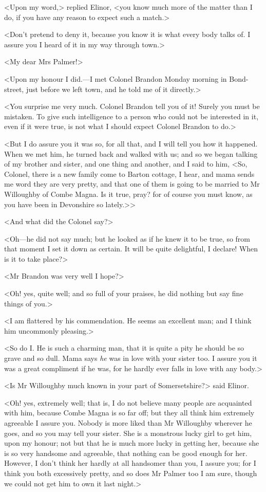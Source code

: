 <Upon my word,> replied Elinor, <you know much more of the matter than I do, if you have any reason to expect such a match.>

<Don't pretend to deny it, because you know it is what every body talks of. I assure you I heard of it in my way through town.>

<My dear Mrs Palmer!>

<Upon my honour I did.—I met Colonel Brandon Monday morning in Bond-street, just before we left town, and he told me of it directly.>

<You surprise me very much. Colonel Brandon tell you of it! Surely you must be mistaken. To give such intelligence to a person who could not be interested in it, even if it were true, is not what I should expect Colonel Brandon to do.>

<But I do assure you it was so, for all that, and I will tell you how it happened. When we met him, he turned back and walked with us; and so we began talking of my brother and sister, and one thing and another, and I said to him, <So, Colonel, there is a new family come to Barton cottage, I hear, and mama sends me word they are very pretty, and that one of them is going to be married to Mr Willoughby of Combe Magna. Is it true, pray? for of course you must know, as you have been in Devonshire so lately.>>

<And what did the Colonel say?>

<Oh—he did not say much; but he looked as if he knew it to be true, so from that moment I set it down as certain. It will be quite delightful, I declare! When is it to take place?>

<Mr Brandon was very well I hope?>

<Oh! yes, quite well; and so full of your praises, he did nothing but say fine things of you.>

<I am flattered by his commendation. He seems an excellent man; and I think him uncommonly pleasing.>

<So do I\@. He is such a charming man, that it is quite a pity he should be so grave and so dull. Mama says \textit{he} was in love with your sister too. I assure you it was a great compliment if he was, for he hardly ever falls in love with any body.>

<Is Mr Willoughby much known in your part of Somersetshire?> said Elinor.

<Oh! yes, extremely well; that is, I do not believe many people are acquainted with him, because Combe Magna is so far off; but they all think him extremely agreeable I assure you. Nobody is more liked than Mr Willoughby wherever he goes, and so you may tell your sister. She is a monstrous lucky girl to get him, upon my honour; not but that he is much more lucky in getting her, because she is so very handsome and agreeable, that nothing can be good enough for her. However, I don't think her hardly at all handsomer than you, I assure you; for I think you both excessively pretty, and so does Mr Palmer too I am sure, though we could not get him to own it last night.>

